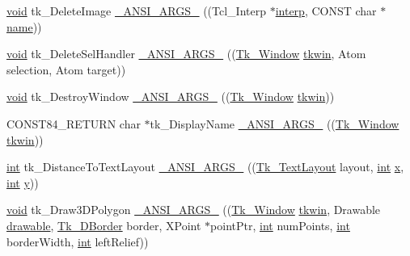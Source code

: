 \begin{DoxyCompactItemize}
\item 
\hyperlink{tk_8h_aba408b7cd755a96426e004c015f5de8e}{void} tk\+\_\+\+Delete\+Image \hyperlink{struct_tk_stubs_afca15c2e855f56c7aa309601df2b5671}{\+\_\+\+A\+N\+S\+I\+\_\+\+A\+R\+G\+S\+\_\+} ((Tcl\+\_\+\+Interp $\ast$\hyperlink{tk_8h_a5ab79c0f5849ee8e6a2e955a6c536cc0}{interp}, C\+O\+N\+ST char $\ast$\hyperlink{tk_8h_a2946c588fc7fa2fa5b43ac54b7872725}{name}))
\item 
\hyperlink{tk_8h_aba408b7cd755a96426e004c015f5de8e}{void} tk\+\_\+\+Delete\+Sel\+Handler \hyperlink{struct_tk_stubs_a099ccd495b7a2251ad9510740cadb9df}{\+\_\+\+A\+N\+S\+I\+\_\+\+A\+R\+G\+S\+\_\+} ((\hyperlink{tk_8h_ab756137de3ee74edc2501bd0d761e37c}{Tk\+\_\+\+Window} \hyperlink{tk_8h_a35df722e7e1b6efd651683b8be7c1490}{tkwin}, Atom selection, Atom target))
\item 
\hyperlink{tk_8h_aba408b7cd755a96426e004c015f5de8e}{void} tk\+\_\+\+Destroy\+Window \hyperlink{struct_tk_stubs_ac8bb0e8b2e9f6b3e1b2f13b2d7b50317}{\+\_\+\+A\+N\+S\+I\+\_\+\+A\+R\+G\+S\+\_\+} ((\hyperlink{tk_8h_ab756137de3ee74edc2501bd0d761e37c}{Tk\+\_\+\+Window} \hyperlink{tk_8h_a35df722e7e1b6efd651683b8be7c1490}{tkwin}))
\item 
C\+O\+N\+S\+T84\+\_\+\+R\+E\+T\+U\+RN char $\ast$tk\+\_\+\+Display\+Name \hyperlink{struct_tk_stubs_a0bdb42cc8648885a22c0a2d803ff7e75}{\+\_\+\+A\+N\+S\+I\+\_\+\+A\+R\+G\+S\+\_\+} ((\hyperlink{tk_8h_ab756137de3ee74edc2501bd0d761e37c}{Tk\+\_\+\+Window} \hyperlink{tk_8h_a35df722e7e1b6efd651683b8be7c1490}{tkwin}))
\item 
\hyperlink{tk_8h_a83f82f76e7fed06f4c49d2db94028a6d}{int} tk\+\_\+\+Distance\+To\+Text\+Layout \hyperlink{struct_tk_stubs_a2f7bece180a4473de89beb07e547383a}{\+\_\+\+A\+N\+S\+I\+\_\+\+A\+R\+G\+S\+\_\+} ((\hyperlink{tk_8h_aac15dd7e96fec9e6c8255fd454d4d617}{Tk\+\_\+\+Text\+Layout} layout, \hyperlink{tk_8h_a83f82f76e7fed06f4c49d2db94028a6d}{int} \hyperlink{tk_8h_a61ebd54d47cc56787649a3b8f126bda1}{x}, \hyperlink{tk_8h_a83f82f76e7fed06f4c49d2db94028a6d}{int} \hyperlink{tk_8h_a40f4f3601c0eaa8ca46b1a164264696d}{y}))
\item 
\hyperlink{tk_8h_aba408b7cd755a96426e004c015f5de8e}{void} tk\+\_\+\+Draw3\+D\+Polygon \hyperlink{struct_tk_stubs_a77d15fb0892797c2041af6a711d1df52}{\+\_\+\+A\+N\+S\+I\+\_\+\+A\+R\+G\+S\+\_\+} ((\hyperlink{tk_8h_ab756137de3ee74edc2501bd0d761e37c}{Tk\+\_\+\+Window} \hyperlink{tk_8h_a35df722e7e1b6efd651683b8be7c1490}{tkwin}, Drawable \hyperlink{tk_8h_aa51f8466cbc86ba8ba27b8e32a0361c7}{drawable}, \hyperlink{tk_8h_a7691523098431859a6f7514f1422e545}{Tk\+\_\+D\+Border} border, X\+Point $\ast$point\+Ptr, \hyperlink{tk_8h_a83f82f76e7fed06f4c49d2db94028a6d}{int} num\+Points, \hyperlink{tk_8h_a83f82f76e7fed06f4c49d2db94028a6d}{int} border\+Width, \hyperlink{tk_8h_a83f82f76e7fed06f4c49d2db94028a6d}{int} left\+Relief))

\end{DoxyCompactItemize}
